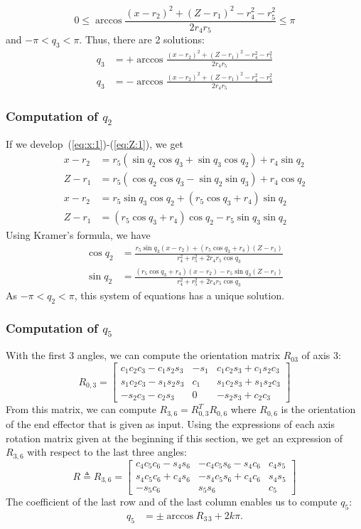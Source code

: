 \documentclass{article}
\begin{document}
$$
0 \leq \arccos \frac{(x-r_2)^2 + (Z-r_1)^2 - r_4^2 - r_5^2}{2r_4r_5} \leq \pi
$$
and $-\pi < q_3 < \pi$. Thus, there are 2 solutions:
\begin{align*}
  q_3 &= + \arccos \frac{(x-r_2)^2 + (Z-r_1)^2 - r_4^2 - r_5^2}{2r_4r_5}\\
  q_3 &= - \arccos \frac{(x-r_2)^2 + (Z-r_1)^2 - r_4^2 - r_5^2}{2r_4r_5}
\end{align*}
\subsubsection*{Computation of $q_2$}

If we develop~(\ref{eq:x:1})-(\ref{eq:Z:1}), we get
\begin{align*}
  x - r_2 &= r_5(\sin q_2 \cos q_3 + \sin q_3 \cos q_2) + r_4 \sin q_2 \\
  Z -r_1 &= r_5(\cos q_2 \cos q_3 - \sin q_2 \sin q_3) + r_4\cos q_2\\
  x - r_2 &= r_5\sin q_3 \cos q_2  + (r_5\cos q_3 + r_4)\sin q_2\\
  Z -r_1 &= (r_5\cos q_3 + r_4)\cos q_2 - r_5\sin q_3\sin q_2
\end{align*}
Using Kramer's formula, we have
\begin{align*}
  \cos q_2 &= \frac{r_5\sin q_3(x-r_2) + (r_5\cos q_3 + r_4)(Z-r_1)}{r_4^2 + r_5^2 + 2r_4r_5\cos q_3}\\
  \sin q_2 &= \frac{(r_5\cos q_3 + r_4)(x-r_2)-r_5\sin q_3(Z-r_1)}{r_4^2 + r_5^2 + 2r_4r_5\cos q_3}
\end{align*}
As $-\pi < q_2 < \pi$, this system of equations has a unique solution.

\subsubsection*{Computation of $q_5$}

With the first 3 angles, we can compute the orientation matrix $R_{03}$ of axis 3:
$$
R_{0,3} =
\begin{bmatrix}
  c_1c_2c_3 - c_1s_2s_3 & -s_1 & c_1c_2s_3 + c_1s_2c_3\\
  s_1c_2c_3 - s_1s_2s_3 & c_1  & s_1c_2s_3 + s_1s_2c_3 \\
  -s_2c_3-c_2s_3        & 0   & -s_2s_3 + c_2c_3
\end{bmatrix}
$$
From this matrix, we can compute $R_{3,6}=R_{0,3}^T R_{0,6}$ where $R_{0,6}$ is the orientation of the
end effector that is given as input. Using the expressions of each axis rotation matrix given at the beginning if this section, we get an expression of $R_{3,6}$ with respect to the last three angles:
$$
R \triangleq R_{3,6}=
\begin{bmatrix}
  c_4c_5c_6-s_4s_6 & -c_4c_5s_6-s_4c_6 & c_4s_5 \\
  s_4c_5c_6+c_4s_6 & -s_4c_5s_6+c_4c_6 & s_4s_5 \\
  -s_5c_6 & s_5s_6 & c_5
\end{bmatrix}
$$
The coefficient of the last row and of the last column enables us to compute $q_5$:
\begin{align*}
  q_5 &= \pm \arccos R_{3\,3} + 2k\pi.
\end{align*}
\end{document}

